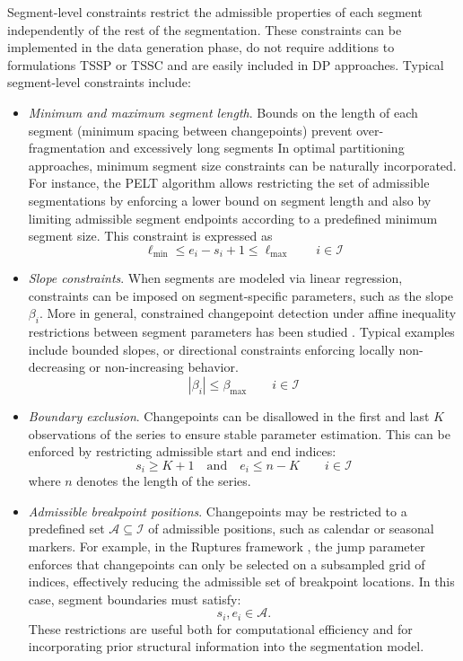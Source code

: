 \documentclass[preprints,article,submit,pdftex,moreauthors]{Definitions/mdpi}
\begin{document}
Segment-level constraints restrict the admissible properties of each segment independently of the rest of the segmentation. These constraints can be implemented in the data generation phase, do not require additions to formulations TSSP or TSSC and are easily included in DP approaches. 
Typical segment-level constraints include:
\begin{itemize}
	\item {\it Minimum and maximum segment length}.	Bounds on the length of each segment (minimum spacing between changepoints) prevent over-fragmentation and excessively long segments In optimal partitioning approaches,  minimum segment size constraints can be naturally incorporated. For instance, the PELT algorithm \cite{KFE12} allows restricting the set of admissible segmentations by enforcing a lower bound on segment length and also by limiting admissible segment endpoints according to a predefined minimum segment size. This constraint is expressed as
	\begin{equation}
		\ell_{\min} \leq e_i - s_i + 1 \leq \ell_{\max} \qquad i \in \mathcal{I}
	\end{equation}
	
	\item {\it Slope constraints}.
	When segments are modeled via linear regression, constraints can be imposed on segment-specific parameters, such as the slope $\beta_i$. More in general, constrained changepoint detection under affine inequality restrictions between segment parameters has been studied \cite{hocking2017constrained}. Typical examples include bounded slopes, or directional constraints enforcing locally non-decreasing or non-increasing behavior.
	\begin{equation}
		|\beta_i| \leq \beta_{\max} \qquad i \in \mathcal{I}
	\end{equation}
	 
	\item {\it Boundary exclusion}.
	Changepoints can be disallowed in the first and last $K$ observations of the series to ensure stable parameter estimation. This can be enforced by restricting admissible start and end indices:
	\begin{equation}
		s_i \geq K + 1 \quad \text{and} \quad e_i \leq n - K  \qquad i \in \mathcal{I}
	\end{equation}
	where $n$ denotes the length of the series.
	
	\item {\it Admissible breakpoint positions}.
	Changepoints may be restricted to a predefined set $\mathcal{A} \subseteq \mathcal{I}$ of admissible positions, such as calendar or seasonal markers. For example, in the Ruptures framework \cite{TOV20}, the jump parameter enforces that changepoints can only be selected on a subsampled grid of indices, effectively reducing the admissible set of breakpoint locations. In this case, segment boundaries must satisfy:
	\begin{equation}
		s_i,e_i \in \mathcal{A}.
	\end{equation}
	These restrictions are useful both for computational efficiency and for incorporating prior structural information into the segmentation model. 	
\end{itemize}
\end{document}
